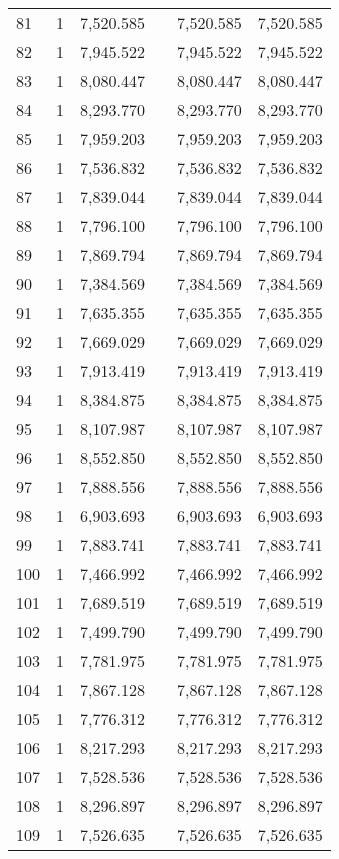 \begin{table}[!htbp]
\begin{tabular}{@{\extracolsep{5pt}}lccccc}
81 & 1 & 7,520.585 &  & 7,520.585 & 7,520.585 \\ 
82 & 1 & 7,945.522 &  & 7,945.522 & 7,945.522 \\ 
83 & 1 & 8,080.447 &  & 8,080.447 & 8,080.447 \\ 
84 & 1 & 8,293.770 &  & 8,293.770 & 8,293.770 \\ 
85 & 1 & 7,959.203 &  & 7,959.203 & 7,959.203 \\ 
86 & 1 & 7,536.832 &  & 7,536.832 & 7,536.832 \\ 
87 & 1 & 7,839.044 &  & 7,839.044 & 7,839.044 \\ 
88 & 1 & 7,796.100 &  & 7,796.100 & 7,796.100 \\ 
89 & 1 & 7,869.794 &  & 7,869.794 & 7,869.794 \\ 
90 & 1 & 7,384.569 &  & 7,384.569 & 7,384.569 \\ 
91 & 1 & 7,635.355 &  & 7,635.355 & 7,635.355 \\ 
92 & 1 & 7,669.029 &  & 7,669.029 & 7,669.029 \\ 
93 & 1 & 7,913.419 &  & 7,913.419 & 7,913.419 \\ 
94 & 1 & 8,384.875 &  & 8,384.875 & 8,384.875 \\ 
95 & 1 & 8,107.987 &  & 8,107.987 & 8,107.987 \\ 
96 & 1 & 8,552.850 &  & 8,552.850 & 8,552.850 \\ 
97 & 1 & 7,888.556 &  & 7,888.556 & 7,888.556 \\ 
98 & 1 & 6,903.693 &  & 6,903.693 & 6,903.693 \\ 
99 & 1 & 7,883.741 &  & 7,883.741 & 7,883.741 \\ 
100 & 1 & 7,466.992 &  & 7,466.992 & 7,466.992 \\ 
101 & 1 & 7,689.519 &  & 7,689.519 & 7,689.519 \\ 
102 & 1 & 7,499.790 &  & 7,499.790 & 7,499.790 \\ 
103 & 1 & 7,781.975 &  & 7,781.975 & 7,781.975 \\ 
104 & 1 & 7,867.128 &  & 7,867.128 & 7,867.128 \\ 
105 & 1 & 7,776.312 &  & 7,776.312 & 7,776.312 \\ 
106 & 1 & 8,217.293 &  & 8,217.293 & 8,217.293 \\ 
107 & 1 & 7,528.536 &  & 7,528.536 & 7,528.536 \\ 
108 & 1 & 8,296.897 &  & 8,296.897 & 8,296.897 \\ 
109 & 1 & 7,526.635 &  & 7,526.635 & 7,526.635 \\ 

\end{tabular}
\end{table}
